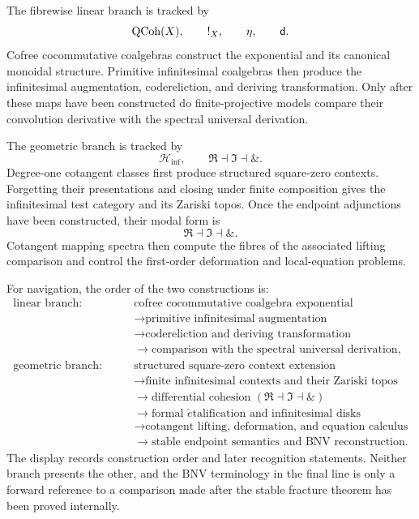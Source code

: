 The fibrewise linear branch is tracked by
\[
    \operatorname{QCoh}(X),
    \qquad
    !_X,
    \qquad
    \eta,
    \qquad
    \mathsf d.
\]
Cofree cocommutative coalgebras construct the exponential and its canonical
monoidal structure. Primitive infinitesimal coalgebras then produce the
infinitesimal augmentation, codereliction, and deriving transformation. Only
after these maps have been constructed do finite-projective models compare
their convolution derivative with the spectral universal derivation.

The geometric branch is tracked by
\[
    \mathcal H_{\inf},
    \qquad
    \Re\dashv\Im\dashv\&.
\]
Degree-one cotangent classes first produce structured square-zero contexts.
Forgetting their presentations and closing under finite composition gives the
infinitesimal test category and its Zariski topos. Once the endpoint
adjunctions have been constructed, their modal form is
\[
    \Re\dashv\Im\dashv\&.
\]
Cotangent mapping spectra then compute the fibres of the associated lifting
comparison and control the first-order deformation and local-equation
problems.

For navigation, the order of the two constructions is:
\[
\boxed{
\begin{aligned}
\text{linear branch:}\qquad
&
\text{cofree cocommutative coalgebra exponential}
\\
&\longrightarrow
\text{primitive infinitesimal augmentation}
\\
&\longrightarrow
\text{codereliction and deriving transformation}
\\
&\longrightarrow
\text{comparison with the spectral universal derivation},
\\[0.8em]
\text{geometric branch:}\qquad
&
\text{structured square-zero context extension}
\\
&\longrightarrow
\text{finite infinitesimal contexts and their Zariski topos}
\\
&\longrightarrow
\text{differential cohesion }(\Re\dashv\Im\dashv\&)
\\
&\longrightarrow
\text{formal \(\acute{e}\)talification and infinitesimal disks}
\\
&\longrightarrow
\text{cotangent lifting, deformation, and equation calculus}
\\
&\longrightarrow
\text{stable endpoint semantics and BNV reconstruction}.
\end{aligned}}
\]
The display records construction order and later recognition statements.
Neither branch presents the other, and the BNV terminology in the final line
is only a forward reference to a comparison made after the stable fracture
theorem has been proved internally.


